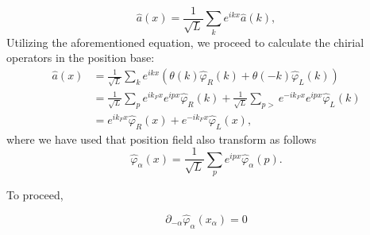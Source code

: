 \begin{equation} \label{eq_fuorier_definition_q}
    \hat{a}(x)  =\frac{1}{\sqrt{L}} \sum_{k} e^{i k x} \hat{a}(k),
\end{equation}
Utilizing the aforementioned equation, we proceed to calculate the chirial operators in the position base:
\begin{equation} \label{eq_fourier_a_chirial}
    \begin{aligned}
\hat{a}(x) &  =\frac{1}{\sqrt{L}} \sum_{k} e^{i k x}\left(\theta(k) \hat{\varphi}_{R}(k)+\theta(-k) \hat{\varphi}_{L}(k)\right) \\
& =\frac{1}{\sqrt{L}} \sum_{p} e^{i k_{F} x} e^{i p x} \hat{\varphi}_{R}(k)+\frac{1}{\sqrt{L}} \sum_{p>} e^{-i k_{F} x} e^{i p x} \hat{\varphi}_{L}(k) \\
& =e^{i k_{F} x} \hat{\varphi}_{R}(x)+e^{-i k_{F} x} \hat{\varphi}_{L}(x),
\end{aligned}
\end{equation}
where we have used that position field also transform as follows
\begin{equation} \label{eq_fouerier_chrial_fields}
    \hat{\varphi}_{\alpha}(x)=\frac{1}{\sqrt{L}} \sum_{p} e^{i p x} \hat{\varphi}_{\alpha}(p).
\end{equation}

    
To proceed,


\begin{equation}
    \partial_{-\alpha} \hat{\varphi}_{\alpha}\left(x_{\alpha}\right)=0
\end{equation}






